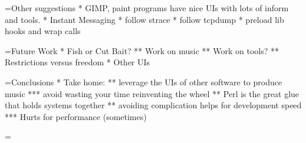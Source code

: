 \documentclass[titlepage,usenames,a4,landscape,semhelv]{seminar}
\begin{document}
\begin{slide}

=Other suggestions
* GIMP, paint programs have nice UIs with lots of inform and tools.
* Instant Messaging
* follow strace
* follow tcpdump
* preload lib hooks and wrap calls


=Future Work
* Fish or Cut Bait?
** Work on music
** Work on tools?
** Restrictions versus freedom
* Other UIs

=Conclusions
* Take home:
** leverage the UIs of other software to produce music
*** avoid wasting your time reinventing the wheel
** Perl is the great glue that holds systems together
** avoiding complication helps for development speed
*** Hurts for performance (sometimes)


=
\end{slide}
\end{document}
